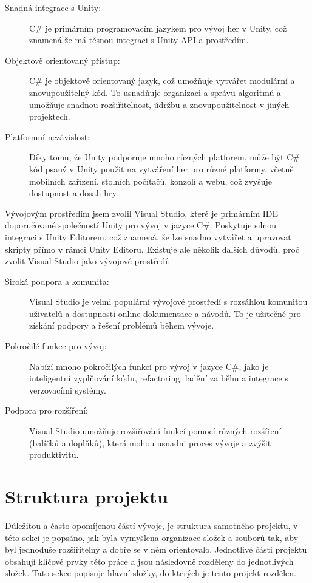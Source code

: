\begin{description}
	\item [Snadná integrace s Unity:] C\# je primárním programovacím jazykem pro vývoj her v Unity, což znamená že má těsnou integraci s Unity API a prostředím.
	\item [Objektově orientovaný přístup:] C\# je objektově orientovaný jazyk, což umožňuje vytvářet modulární a znovupoužitelný kód. To usnadňuje organizaci a správu algoritmů a umožňuje snadnou rozšiřitelnost, údržbu a znovupoužitelnost v jiných projektech.
	\item [Platformní nezávislost:] Díky tomu, že Unity podporuje mnoho různých platforem, může být C\# kód psaný v Unity použit na vytváření her pro různé platformy, včetně mobilních zařízení, stolních počítačů, konzolí a webu, což zvyšuje dostupnost a dosah hry.
\end{description}

Vývojovým prostředím jsem zvolil Visual Studio, které je primárním IDE doporučované společností Unity pro vývoj v jazyce C\#. Poskytuje silnou integraci s Unity Editorem, což znamená, že lze snadno vytvářet a upravovat skripty přímo v rámci Unity Editoru. Existuje ale několik dalších důvodů, proč zvolit Visual Studio jako vývojové prostředí:
 
\begin{description}
	\item [Široká podpora a komunita:] Visual Studio je velmi populární vývojové prostředí s rozsáhlou komunitou uživatelů a dostupností online dokumentace a návodů. To je užitečné pro získání podpory a řešení problémů během vývoje.
	\item [Pokročilé funkce pro vývoj:] Nabízí mnoho pokročilých funkcí pro vývoj v jazyce C\#, jako je inteligentní vyplňování kódu, refactoring, ladění za běhu a integrace s verzovacími systémy. 
	\item [Podpora pro rozšíření:] Visual Studio umožňuje rozšiřování funkcí pomocí různých rozšíření (balíčků a doplňků), která mohou usnadni proces vývoje a zvýšit produktivitu.
\end{description}

\section{Struktura projektu}
Důležitou a často opomíjenou částí vývoje, je struktura samotného projektu, v této sekci je popsáno, jak byla vymyšlena organizace složek a souborů tak, aby byl jednoduše rozšiřitelný a dobře se v něm orientovalo. Jednotlivé části projektu obsahují klíčové prvky této práce a jsou následovně rozděleny do jednotlivých složek. Tato sekce popisuje hlavní složky, do kterých je tento projekt rozdělen.

